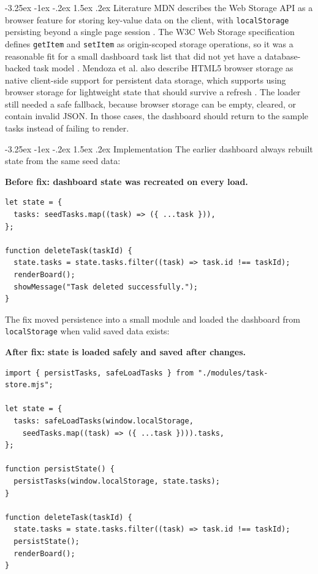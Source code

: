 \documentclass[12pt,a4paper]{article}
\makeatletter
\renewcommand\subsection{\@startsection{subsection}{2}{\z@}%
  {-3.25ex \@plus -1ex \@minus -.2ex}%
  {1.5ex \@plus .2ex}%
  {\normalfont\bfseries\fontsize{12}{14}\selectfont}}
\makeatother
\begin{document}
\subsection{Literature}
MDN describes the Web Storage API as a browser feature for storing key-value data on the client, with \texttt{localStorage} persisting beyond a single page session \cite{mdn-web-storage}. The W3C Web Storage specification defines \texttt{getItem} and \texttt{setItem} as origin-scoped storage operations, so it was a reasonable fit for a small dashboard task list that did not yet have a database-backed task model \cite{w3c-web-storage}. Mendoza et al. also describe HTML5 browser storage as native client-side support for persistent data storage, which supports using browser storage for lightweight state that should survive a refresh \cite{mendoza-browstex}. The loader still needed a safe fallback, because browser storage can be empty, cleared, or contain invalid JSON. In those cases, the dashboard should return to the sample tasks instead of failing to render.

\subsection{Implementation}
The earlier dashboard always rebuilt state from the same seed data:

\noindent\textbf{Before fix: dashboard state was recreated on every load.}
{\footnotesize
\begin{verbatim}
let state = {
  tasks: seedTasks.map((task) => ({ ...task })),
};

function deleteTask(taskId) {
  state.tasks = state.tasks.filter((task) => task.id !== taskId);
  renderBoard();
  showMessage("Task deleted successfully.");
}
\end{verbatim}
}

The fix moved persistence into a small module and loaded the dashboard from \texttt{localStorage} when valid saved data exists:

\noindent\textbf{After fix: state is loaded safely and saved after changes.}
{\footnotesize
\begin{verbatim}
import { persistTasks, safeLoadTasks } from "./modules/task-store.mjs";

let state = {
  tasks: safeLoadTasks(window.localStorage,
    seedTasks.map((task) => ({ ...task }))).tasks,
};

function persistState() {
  persistTasks(window.localStorage, state.tasks);
}

function deleteTask(taskId) {
  state.tasks = state.tasks.filter((task) => task.id !== taskId);
  persistState();
  renderBoard();
}
\end{verbatim}
}
\end{document}
